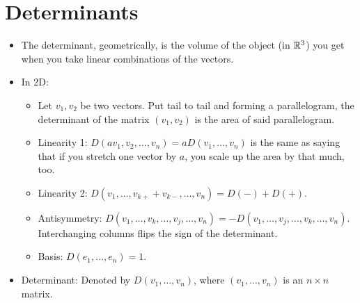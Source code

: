 \documentclass[../../notes.tex]{subfiles}
\begin{document}
\chapter{Determinants}
\begin{itemize}
    \item {}The determinant, geometrically, is the volume of the object (in $\mathbb{R}^3$) you get when you take linear combinations of the vectors.
    \item In 2D:
    \begin{itemize}
        \item Let $v_1,v_2$ be two vectors. Put tail to tail and forming a parallelogram, the determinant of the matrix $(v_1,v_2)$ is the area of said parallelogram.
        \item Linearity 1: $D(av_1,v_2,\dots,v_n)=aD(v_1,\dots,v_n)$ is the same as saying that if you stretch one vector by $a$, you scale up the area by that much, too.
        \item Linearity 2: $D(v_1,\dots,v_{k+}+v_{k-},\dots,v_n)=D(-)+D(+)$.
        \item Antisymmetry: $D(v_1,\dots,v_k,\dots,v_j,\dots,v_n)=-D(v_1,\dots,v_j,\dots,v_k,\dots,v_n)$. Interchanging columns flips the sign of the determinant.
        \item Basis: $D(e_1,\dots,e_n)=1$.
    \end{itemize}
    \item Determinant: Denoted by $D(v_1,\dots,v_n)$, where $(v_1,\dots,v_n)$ is an $n\times n$ matrix.
\end{itemize}
\end{document}
